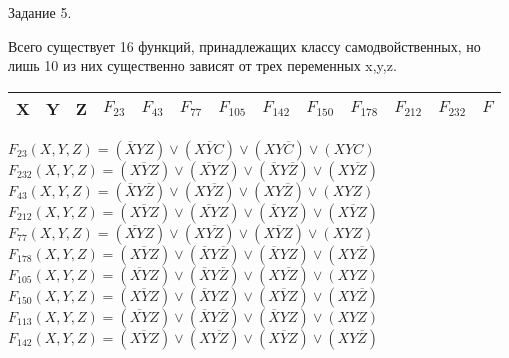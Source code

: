 \documentclass[a4paper,12pt]{report} %
\begin{document}
\bigskip

\begin{center}
	Задание 5.\\
\end{center}

\begin{flushleft}
	Всего существует 16 функций, принадлежащих классу самодвойственных, но лишь 10 из них
	существенно зависят от трех переменных x,y,z.\\
	\bigskip
	
	\begin{tabular}{| c | c | c | c | c | c | c | c | c | c | c | c | c |}
	\hline
	X & Y & Z & $F_{23}$ & $F_{43}$ & $F_{77}$ & $F_{105}$ & $F_{142}$ & $F_{150}$ & $F_{178}$ & $F_{212}$ & $F_{232}$ & $F_{}$\\
	\hline
	\end{tabular}
	\bigskip
	
	$F_{23}(X,Y,Z)=(\overline{X}YZ) \vee (X\overline{Y}C) \vee (XY\overline{C}) \vee (XYC)$\\
	$F_{232}(X,Y,Z)=(\overline{XYZ}) \vee (\overline{XY}Z) \vee (\overline{X}Y\overline{Z}) \vee (X\overline{YZ})$\\
	$F_{43}(X,Y,Z)=(\overline{X}Y\overline{Z}) \vee (X\overline{YZ}) \vee (XY\overline{Z}) \vee (XYZ)$\\
	$F_{212}(X,Y,Z)=(\overline{XYZ}) \vee (\overline{XY}Z) \vee (\overline{X}YZ) \vee (X\overline{Y}Z)$\\
	$F_{77}(X,Y,Z)=(\overline{XY}Z) \vee (X\overline{YZ}) \vee (X\overline{Y}Z) \vee (XYZ)$\\
	$F_{178}(X,Y,Z)=(\overline{XYZ}) \vee (\overline{X}Y\overline{Z}) \vee (\overline{X}YZ) \vee (XY\overline{Z})$\\
	$F_{105}(X,Y,Z)=(\overline{XY}Z) \vee (\overline{X}Y\overline{Z}) \vee (X\overline{YZ})\vee (XYZ)$\\
	$F_{150}(X,Y,Z)=(\overline{XYZ}) \vee (\overline{X}YZ) \vee (X\overline{Y}Z) \vee (XY\overline{Z})$\\
	$F_{113}(X,Y,Z)=(\overline{XY}Z) \vee (\overline{X}Y\overline{Z}) \vee (\overline{X}YZ) \vee (XYZ)$\\
	$F_{142}(X,Y,Z)=(\overline{XYZ}) \vee (X\overline{YZ}) \vee (X\overline{Y}Z) \vee (XY\overline{Z})$\\
\end{flushleft}

\bigskip
\end{document}
